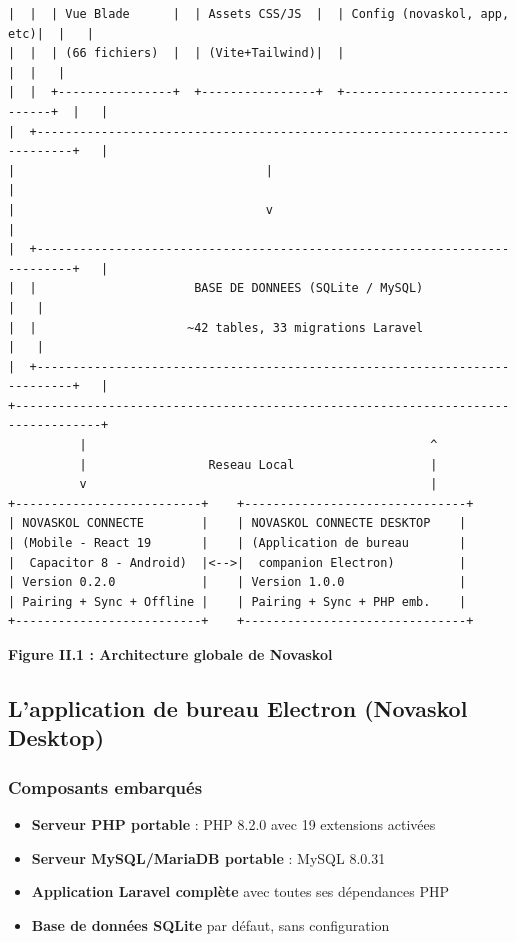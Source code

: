\documentclass[12pt,a4paper,twoside]{report}
\begin{document}
\begin{verbatim}
|  |  | Vue Blade      |  | Assets CSS/JS  |  | Config (novaskol, app, etc)|  |   |
|  |  | (66 fichiers)  |  | (Vite+Tailwind)|  |                             |  |   |
|  |  +----------------+  +----------------+  +-----------------------------+  |   |
|  +---------------------------------------------------------------------------+   |
|                                   |                                                |
|                                   v                                                |
|  +---------------------------------------------------------------------------+   |
|  |                      BASE DE DONNEES (SQLite / MySQL)                     |   |
|  |                     ~42 tables, 33 migrations Laravel                     |   |
|  +---------------------------------------------------------------------------+   |
+----------------------------------------------------------------------------------+
          |                                                ^
          |                 Reseau Local                   |
          v                                                |
+--------------------------+    +-------------------------------+
| NOVASKOL CONNECTE        |    | NOVASKOL CONNECTE DESKTOP    |
| (Mobile - React 19       |    | (Application de bureau       |
|  Capacitor 8 - Android)  |<-->|  companion Electron)         |
| Version 0.2.0            |    | Version 1.0.0                |
| Pairing + Sync + Offline |    | Pairing + Sync + PHP emb.    |
+--------------------------+    +-------------------------------+
\end{verbatim}

\begin{center}
\textbf{Figure II.1 : Architecture globale de Novaskol}
\end{center}

\subsection{L'application de bureau Electron (Novaskol Desktop)}

\subsubsection{Composants embarqués}

\begin{itemize}
    \item \textbf{Serveur PHP portable} : PHP 8.2.0 avec 19 extensions activées
    \item \textbf{Serveur MySQL/MariaDB portable} : MySQL 8.0.31
    \item \textbf{Application Laravel complète} avec toutes ses dépendances PHP
    \item \textbf{Base de données SQLite} par défaut, sans configuration
\end{itemize}
\end{document}
